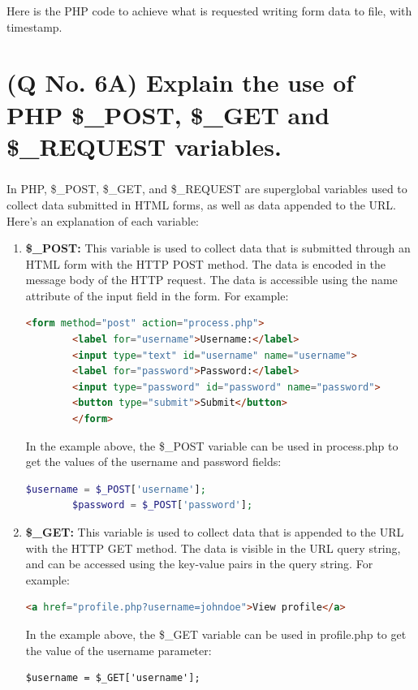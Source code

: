 \documentclass[11pt]{article}
\begin{document}
    Here is the PHP code to achieve what is requested writing form data to file, with timestamp.
    


\section{(Q No. 6A) Explain the use of PHP \$\_POST, \$\_GET and \$\_REQUEST variables.}
\subparagraph{}
    In PHP, \$\_POST, \$\_GET, and \$\_REQUEST are superglobal variables used to collect data submitted in HTML forms, as well as data appended to the URL. Here's an explanation of each variable:

  \begin{enumerate}
    \item   \textbf{\$\_POST:} This variable is used to collect data that is submitted through an HTML form with the HTTP POST method. The data is encoded in the message body of the HTTP request. The data is accessible using the name attribute of the input field in the form. For example:
    \begin{lstlisting}[language=html, caption={form.html}]
        <form method="post" action="process.php">
        <label for="username">Username:</label>
        <input type="text" id="username" name="username">
        <label for="password">Password:</label>
        <input type="password" id="password" name="password">
        <button type="submit">Submit</button>
        </form>
    \end{lstlisting}
    In the example above, the \$\_POST variable can be used in process.php to get the values of the username and password fields:
    \begin{lstlisting}[language=php, caption={process.php}]
        $username = $_POST['username'];
        $password = $_POST['password'];
    \end{lstlisting}

    \item \textbf{\$\_GET:} This variable is used to collect data that is appended to the URL with the HTTP GET method. The data is visible in the URL query string, and can be accessed using the key-value pairs in the query string. For example:
    \begin{lstlisting}[language=html, caption={link.html}]
        <a href="profile.php?username=johndoe">View profile</a>
    \end{lstlisting}
    In the example above, the \$\_GET variable can be used in profile.php to get the value of the username parameter:
    \begin{lstlisting}[language=html, caption={profile.php}]
        $username = $_GET['username'];
    \end{lstlisting}


\end{enumerate}
\end{document}
